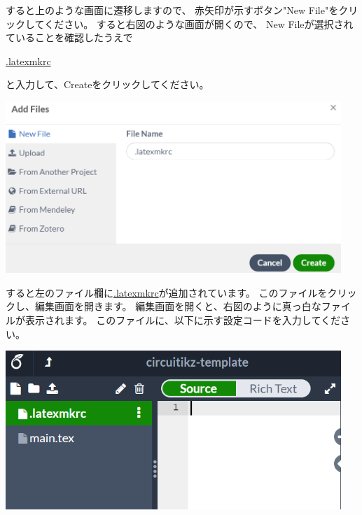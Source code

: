 		\noindent
		\begin{minipage}{0.4\hsize}%
			すると上のような画面に遷移しますので、
			赤矢印が示すボタン"New File"をクリックしてください。
			すると右図のような画面が開くので、
			New Fileが選択されていることを確認したうえで
			\begin{mdframed}[style=shadow]
				\url{.latexmkrc}
			\end{mdframed}\vspace{-3mm}
			と入力して、Createをクリックしてください。
		\end{minipage}\hfill
		\begin{minipage}{0.6\hsize}
			\begin{flushright}
				\includegraphics[width=0.95\textwidth]{overleaf-editer-newfile.png}		
			\end{flushright}
		\end{minipage}

		\noindent
		\begin{minipage}{0.4\hsize}
			すると左のファイル欄に\url{.latexmkrc}が追加されています。
			このファイルをクリックし、編集画面を開きます。
			編集画面を開くと、右図のように真っ白なファイルが表示されます。
			このファイルに、以下に示す設定コードを入力してください。
		\end{minipage}\hfill
		\begin{minipage}{0.6\hsize}
			\begin{flushright}
				\includegraphics[width=0.95\textwidth]{overleaf-editer-latexmkrc.png}
			\end{flushright}
		\end{minipage}

